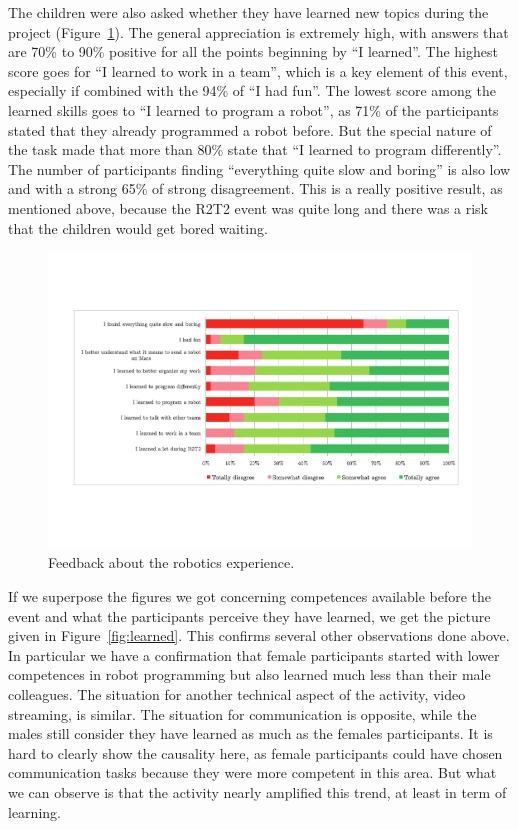 \documentclass{intech-journal}
\begin{document}
The children were also asked whether they have learned new topics during the project (Figure~\ref{fig:robotics}). 
The general appreciation is extremely high, with answers that are 70\% to 90\% positive for all the points beginning by ``I learned''. 
The highest score goes for ``I learned to work in a team'', which is a key element of this event, especially if combined with the 94\% of ``I had fun''.
The lowest score among the learned skills goes to ``I learned to program a robot'', as 71\% of the participants stated that they already programmed a robot before.
But the special nature of the task made that more than 80\% state that ``I learned to program differently''.
The number of participants finding ``everything quite slow and boring'' is also low and with a strong 65\% of strong disagreement. 
This is a really positive result, as mentioned above, because the R2T2 event was quite long and there was a risk that the children would get bored waiting. 

\begin{figure}[ht]
 \centering
    \includegraphics[width=0.9\columnwidth]{figures/robotics.pdf}
  \caption{Feedback about the robotics experience.}
  \label{fig:robotics} 
\end{figure}

If we superpose the figures we got concerning competences available before the event and what the participants perceive they have learned, we get the picture given in Figure~\ref{fig:learned}.
This confirms several other observations done above.
In particular we have a confirmation that female participants started with lower competences in robot programming but also learned much less than their male colleagues. 
The situation for another technical aspect of the activity, video streaming, is similar. 
The situation for communication is opposite, while the males still consider they have learned as much as the females participants. 
It is hard to clearly show the causality here, as female participants could have chosen communication tasks because they were more competent in this area. 
But what we can observe is that the activity nearly amplified this trend, at least in term of learning. 
\end{document}
